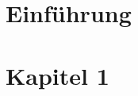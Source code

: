 \documentclass[../main.tex]{subfiles}
\begin{document}

\section{Einführung}
\lipsum[1-2]

\newpage
\section{Kapitel 1}
\end{document}
